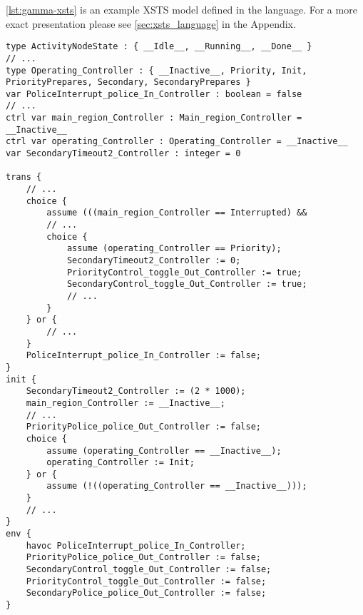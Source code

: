 \autoref{lst:gamma-xsts} is an example XSTS model defined in the language. For a more exact presentation please see \autoref{sec:xsts_language} in the Appendix.

\begin{lstlisting}[float,language=xsts, caption={Gamma XSTS Language representing Traffic Controller statechart.}, label={lst:gamma-xsts}]
type ActivityNodeState : { __Idle__, __Running__, __Done__ }
// ...
type Operating_Controller : { __Inactive__, Priority, Init, PriorityPrepares, Secondary, SecondaryPrepares }
var PoliceInterrupt_police_In_Controller : boolean = false
// ...
ctrl var main_region_Controller : Main_region_Controller = __Inactive__
ctrl var operating_Controller : Operating_Controller = __Inactive__
var SecondaryTimeout2_Controller : integer = 0

trans {
	// ...
	choice {
		assume (((main_region_Controller == Interrupted) && 
		// ...
		choice {
			assume (operating_Controller == Priority);
			SecondaryTimeout2_Controller := 0;
			PriorityControl_toggle_Out_Controller := true;
			SecondaryControl_toggle_Out_Controller := true;
			// ...
		}
	} or {
		// ...
	}
	PoliceInterrupt_police_In_Controller := false;
}
init {
	SecondaryTimeout2_Controller := (2 * 1000);
	main_region_Controller := __Inactive__;
	// ...
	PriorityPolice_police_Out_Controller := false;
	choice {
		assume (operating_Controller == __Inactive__);
		operating_Controller := Init;
	} or {
		assume (!((operating_Controller == __Inactive__)));
	}
	// ...
}
env {
	havoc PoliceInterrupt_police_In_Controller;
	PriorityPolice_police_Out_Controller := false;
	SecondaryControl_toggle_Out_Controller := false;
	PriorityControl_toggle_Out_Controller := false;
	SecondaryPolice_police_Out_Controller := false;
}
\end{lstlisting}
